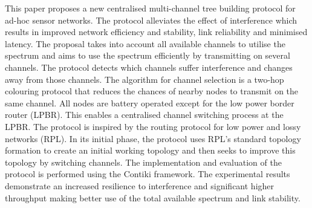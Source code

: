 This paper proposes a new centralised multi-channel tree building protocol for ad-hoc sensor networks. The protocol alleviates the effect of interference which results in improved network efficiency and stability, link reliability and minimised latency. 
        The proposal takes into account all available channels to utilise the spectrum and aims to use the spectrum efficiently by transmitting on several channels. The protocol detects which channels suffer interference and changes away from those channels. The algorithm for channel selection is a two-hop colouring protocol that reduces the chances of nearby nodes to transmit on the same channel.
        All nodes are battery operated except for the low power border router (LPBR). This enables a centralised channel switching process at the LPBR. The protocol is inspired by the routing protocol for low power and lossy networks (RPL). In its initial phase, the protocol uses RPL's standard topology formation to create an initial working topology and then seeks to improve this topology by switching channels.
        The implementation and evaluation of the protocol is performed using the Contiki framework.
The experimental results demonstrate an increased resilience to interference and significant higher throughput making better use of the total available spectrum and link stability. 









